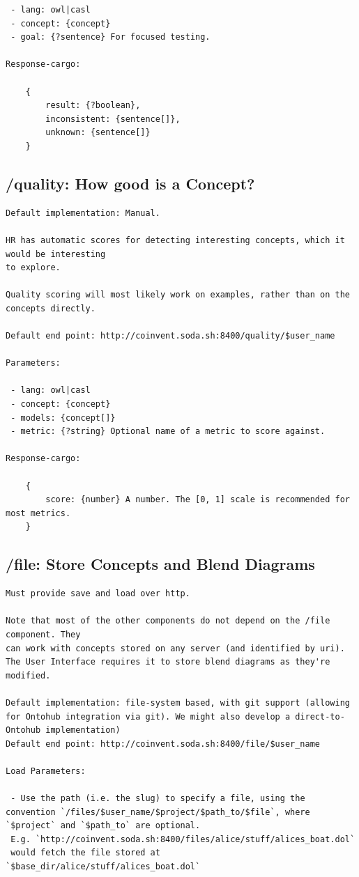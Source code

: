 \begin{appendices}
\begin{verbatim}
 - lang: owl|casl
 - concept: {concept} 
 - goal: {?sentence} For focused testing.

Response-cargo: 
	
	{
		result: {?boolean},
		inconsistent: {sentence[]},
		unknown: {sentence[]}
	}

\end{verbatim}
\subsection{/quality: How good is a Concept?}
\begin{verbatim}
Default implementation: Manual.

HR has automatic scores for detecting interesting concepts, which it would be interesting
to explore.

Quality scoring will most likely work on examples, rather than on the concepts directly.
 
Default end point: http://coinvent.soda.sh:8400/quality/$user_name

Parameters:

 - lang: owl|casl
 - concept: {concept}
 - models: {concept[]} 
 - metric: {?string} Optional name of a metric to score against.

Response-cargo: 
	
	{
		score: {number} A number. The [0, 1] scale is recommended for most metrics.
	}
\end{verbatim}

\subsection{/file: Store Concepts and Blend Diagrams}
\begin{verbatim}
Must provide save and load over http.

Note that most of the other components do not depend on the /file component. They
can work with concepts stored on any server (and identified by uri). The User Interface requires it to store blend diagrams as they're modified.

Default implementation: file-system based, with git support (allowing for Ontohub integration via git). We might also develop a direct-to-Ontohub implementation)   
Default end point: http://coinvent.soda.sh:8400/file/$user_name

Load Parameters: 

 - Use the path (i.e. the slug) to specify a file, using the convention `/files/$user_name/$project/$path_to/$file`, where `$project` and `$path_to` are optional.
 E.g. `http://coinvent.soda.sh:8400/files/alice/stuff/alices_boat.dol`
 would fetch the file stored at `$base_dir/alice/stuff/alices_boat.dol`


\end{verbatim}
\end{appendices}
